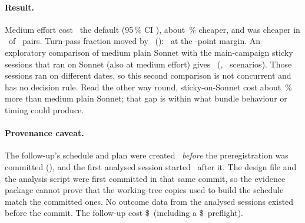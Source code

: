 \begin{table}[htbp]
\centering\small
\caption{Effort-control follow-up (evidence in the \texttt{2026-10-05-effort-control} directory). Cost rows are
geometric-mean ratios of tools-normalized session cost; below 1 means the first arm is cheaper.}
\label{tab:effortfollow}

\end{table}

\paragraph{Result.} Medium effort cost \EcRatio\X\ the default (95\,\% CI \EcCI), about \EcCutPct\,\% cheaper, and
was cheaper in \EcCheaperPairs\ of \EcPairs\ pairs. Turn-pass fraction moved by \EcQual\ (\EcQualCI): \EcQualVerdict\
at the \NIMarginPts-point margin. An exploratory comparison of medium plain Sonnet with the main-campaign sticky
sessions that ran on Sonnet (also at medium effort) gives \EcSecRatio\ (\EcSecCI, \EcSecN\ scenarios). Those
sessions ran on different dates, so this second comparison is not concurrent and has no decision rule. Read the
other way round, sticky-on-Sonnet cost about \EcSecGapPct\,\% more than medium plain Sonnet; that gap is within what
bundle behaviour or timing could produce.

\paragraph{Provenance caveat.} The follow-up's schedule and plan were created \EcScheduleBefore\ \emph{before} the
preregistration was committed (\code{\EcPreregSha}), and the first analysed session started \EcFirstAfter\ after it.
The design file and the analysis script were first committed in that same commit, so the evidence package cannot
prove that the working-tree copies used to build the schedule match the committed ones. No outcome data from the
analysed sessions existed before the commit. The follow-up cost \$\EcSpend\ (including a \$\EcPreflight\ preflight).

